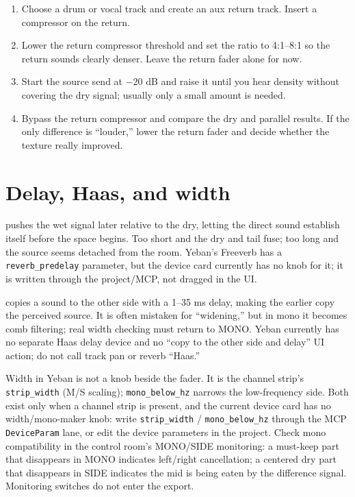 \begin{enumerate}
  \item Choose a drum or vocal track and create an aux return track. Insert a compressor on the return.
  \item Lower the return compressor threshold and set the ratio to 4:1--8:1 so the return sounds clearly denser. Leave the return fader alone for now.
  \item Start the source send at $-20$ dB and raise it until you hear density without covering the dry signal; usually only a small amount is needed.
  \item Bypass the return compressor and compare the dry and parallel results. If the only difference is ``louder,'' lower the return fader and decide whether the texture really improved.
\end{enumerate}

\section{Delay, Haas, and width}

 pushes the wet signal later relative to the dry, letting the direct sound establish itself before the space begins. Too short and the dry and tail fuse; too long and the source seems detached from the room. Yeban's Freeverb has a \texttt{reverb\_predelay} parameter, but the device card currently has no knob for it; it is written through the project/MCP, not dragged in the UI.

 copies a sound to the other side with a 1--35 ms delay, making the earlier copy the perceived source. It is often mistaken for ``widening,'' but in mono it becomes comb filtering; real width checking must return to MONO. Yeban currently has no separate Haas delay device and no ``copy to the other side and delay'' UI action; do not call track pan or reverb ``Haas.''

Width in Yeban is not a knob beside the fader. It is the channel strip's \texttt{strip\_width} (M/S scaling); \texttt{mono\_below\_hz} narrows the low-frequency side. Both exist only when a channel strip is present, and the current device card has no width/mono-maker knob: write \texttt{strip\_width} / \texttt{mono\_below\_hz} through the MCP \texttt{DeviceParam} lane, or edit the device parameters in the project. Check mono compatibility in the control room's MONO/SIDE monitoring: a must-keep part that disappears in MONO indicates left/right cancellation; a centered dry part that disappears in SIDE indicates the mid is being eaten by the difference signal. Monitoring switches do not enter the export.

